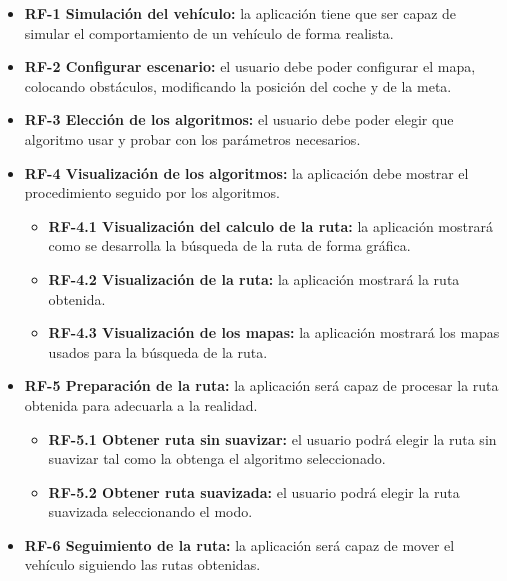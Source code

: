 \begin{itemize}
\tightlist

\item \textbf{RF-1 Simulación del vehículo:} la aplicación tiene que ser capaz de simular el comportamiento de un vehículo de forma realista.
  
\item \textbf{RF-2 Configurar escenario:} el usuario debe poder configurar el mapa, colocando obstáculos, modificando la posición del coche y de la meta.
  
\item \textbf{RF-3 Elección de los algoritmos:} el usuario debe poder elegir que algoritmo usar y probar con los parámetros necesarios.

\item \textbf{RF-4 Visualización de los algoritmos:} la aplicación debe mostrar el procedimiento seguido por los algoritmos.
  
  \begin{itemize}
  \tightlist
  \item \textbf{RF-4.1 Visualización del calculo de la ruta:} la aplicación mostrará como se desarrolla la búsqueda de la ruta de forma gráfica.
  
  \item \textbf{RF-4.2 Visualización de la ruta:} la aplicación mostrará la ruta obtenida.
  
  \item \textbf{RF-4.3 Visualización de los mapas:} la aplicación mostrará los mapas usados para la búsqueda de la ruta.
  \end{itemize}

\item \textbf{RF-5 Preparación de la ruta:} la aplicación será capaz de procesar la ruta obtenida para adecuarla a la realidad.

  \begin{itemize}
  \tightlist
  \item \textbf{RF-5.1 Obtener ruta sin suavizar:} el usuario podrá elegir la ruta sin suavizar tal como la obtenga el algoritmo seleccionado.
  
  \item \textbf{RF-5.2 Obtener ruta suavizada:} el usuario podrá elegir la ruta suavizada seleccionando el modo.

  \end{itemize}

\item \textbf{RF-6 Seguimiento de la ruta:} la aplicación será capaz de mover el vehículo siguiendo las rutas obtenidas.


\end{itemize}
